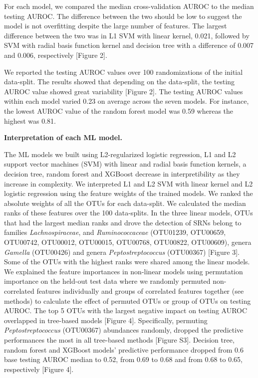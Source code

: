 \documentclass[11pt,]{article}
\begin{document}
For each model, we compared the median cross-validation AUROC to the
median testing AUROC. The difference between the two should be low to
suggest the model is not overfitting despite the large number of
features. The largest difference between the two was in L1 SVM with
linear kernel, 0.021, followed by SVM with radial basis function kernel
and decision tree with a difference of 0.007 and 0.006, respectively
{[}Figure 2{]}.

We reported the testing AUROC values over 100 randomizations of the
initial data-split. The results showed that depending on the data-split,
the testing AUROC value showed great variability {[}Figure 2{]}. The
testing AUROC values within each model varied 0.23 on average across the
seven models. For instance, the lowest AUROC value of the random forest
model was 0.59 whereas the highest was 0.81.

\textbf{Interpretation of each ML model.}

The ML models we built using L2-regularized logistic regression, L1 and
L2 support vector machines (SVM) with linear and radial basis function
kernels, a decision tree, random forest and XGBoost decrease in
interpretibility as they increase in complexity. We interpreted L1 and
L2 SVM with linear kernel and L2 logistic regression using the feature
weights of the trained models. We ranked the absolute weights of all the
OTUs for each data-split. We calculated the median ranks of these
features over the 100 data-splits. In the three linear models, OTUs that
had the largest median ranks and drove the detection of SRNs belong to
families \emph{Lachnospiraceae}, and \emph{Ruminococcaceae} (OTU01239,
OTU00659, OTU00742, OTU00012, OTU00015, OTU00768, OTU00822, OTU00609),
genera \emph{Gamella} (OTU00426) and genera \emph{Peptostreptococcus}
(OTU00367) {[}Figure 3{]}. Some of the OTUs with the highest ranks were
shared among the linear models. We explained the feature importances in
non-linear models using permutation importance on the held-out test data
where we randomly permuted non-correlated features individually and
groups of correlated features together (see methods) to calculate the
effect of permuted OTUs or group of OTUs on testing AUROC. The top 5
OTUs with the largest negative impact on testing AUROC overlapped in
tree-based models {[}Figure 4{]}. Specifically, permuting
\emph{Peptostreptococcus} (OTU00367) abundances randomly, dropped the
predictive performances the most in all tree-based methods {[}Figure
S3{]}. Decision tree, random forest and XGBoost models' predictive
performance dropped from 0.6 base testing AUROC median to 0.52, from
0.69 to 0.68 and from 0.68 to 0.65, respectively {[}Figure 4{]}.
\end{document}
